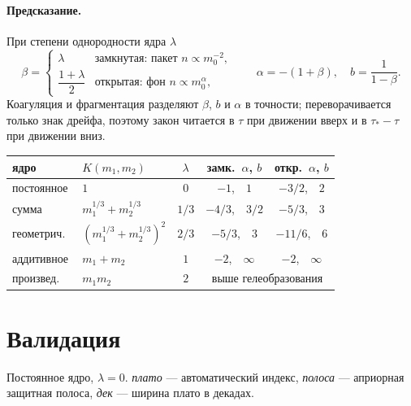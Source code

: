 \documentclass[a4paper,12pt]{article}
\begin{document}
\paragraph{Предсказание.} При степени однородности ядра $\lambda$
\begin{equation}
  \beta =
    \begin{cases}
      \lambda & \text{замкнутая: пакет } n \propto m_0^{-2},\\[2pt]
      \dfrac{1+\lambda}{2} & \text{открытая: фон } n \propto m_0^{\alpha},
    \end{cases}
  \qquad
  \alpha = -(1+\beta),
  \quad
  b = \frac{1}{1-\beta}.
\end{equation}
Коагуляция и фрагментация разделяют $\beta$, $b$ и $\alpha$ в точности;
переворачивается только знак дрейфа, поэтому закон читается в $\tau$ при
движении вверх и в $\tau_\ast - \tau$ при движении вниз.

\begin{center}
\footnotesize
\begin{tabular}{@{}@{}l@{\ \ }l@{\ \ }c@{\ \ }c@{\ \ }c@{}}
\toprule
ядро & $K(m_1,m_2)$ & $\lambda$ &
  замк.\ $\alpha$, $b$ &
  откр.\ $\alpha$, $b$ \\
\midrule
постоянное     & $1$                                & $0$   & $-1$,\ \ $1$    & $-3/2$,\ \ $2$ \\
сумма          & $m_1^{1/3}+m_2^{1/3}$              & $1/3$ & $-4/3$,\ \ $3/2$& $-5/3$,\ \ $3$ \\
геометрич.\    & $(m_1^{1/3}+m_2^{1/3})^2$          & $2/3$ & $-5/3$,\ \ $3$  & $-11/6$,\ \ $6$ \\
аддитивное     & $m_1+m_2$                          & $1$   & $-2$,\ \ $\infty$ & $-2$,\ \ $\infty$ \\
произвед.\     & $m_1 m_2$                          & $2$   & \multicolumn{2}{c}{выше гелеобразования} \\
\bottomrule
\end{tabular}
\end{center}

\section{Валидация}
\label{sec:num_validation}

Постоянное ядро, $\lambda = 0$. \emph{плато} --- автоматический индекс,
\emph{полоса} --- априорная защитная полоса, \emph{дек} --- ширина плато в
декадах.
\end{document}
